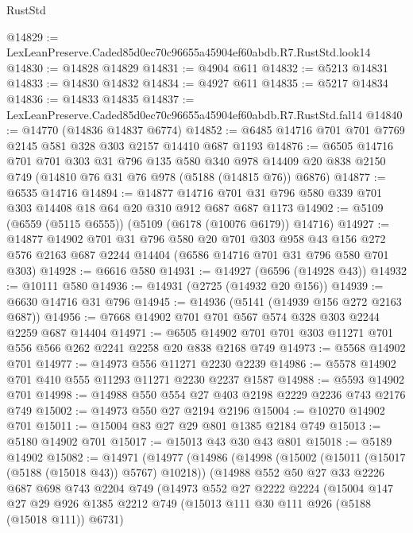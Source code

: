 \begin{lexlean}{RustStd}
\begin{coremodule}
@14829 := LexLeanPreserve.Caded85d0ec70c96655a45904ef60abdb.R7.RustStd.look14
@14830 := @14828 @14829
@14831 := @4904 @611
@14832 := @5213 @14831
@14833 := @14830 @14832
@14834 := @4927 @611
@14835 := @5217 @14834
@14836 := @14833 @14835
@14837 := LexLeanPreserve.Caded85d0ec70c96655a45904ef60abdb.R7.RustStd.fal14
@14840 := @14770 (@14836 @14837 @6774)
@14852 := @6485 @14716 @701 @701 @7769 @2145 @581 @328 @303 @2157 @14410 @687 @1193
@14876 := @6505
    @14716
    @701
    @701
    @303
    @31
    @796
    @135
    @580
    @340
    @978
    @14409
    @20
    @838
    @2150
    @749
    (@14810 @76 @31 @76 @978 (@5188 (@14815 @76)) @6876)
@14877 := @6535 @14716
@14894 := @14877
    @14716
    @701
    @31
    @796
    @580
    @339
    @701
    @303
    @14408
    @18
    @64
    @20
    @310
    @912
    @687
    @687
    @1173
@14902 := @5109 (@6559 (@5115 @6555)) (@5109 (@6178 (@10076 @6179)) @14716)
@14927 := @14877
    @14902
    @701
    @31
    @796
    @580
    @20
    @701
    @303
    @958
    @43
    @156
    @272
    @576
    @2163
    @687
    @2244
    @14404
    (@6586 @14716 @701 @31 @796 @580 @701 @303)
@14928 := @6616 @580
@14931 := @14927 (@6596 (@14928 @43))
@14932 := @10111 @580
@14936 := @14931 (@2725 (@14932 @20 @156))
@14939 := @6630 @14716 @31 @796
@14945 := @14936 (@5141 (@14939 @156 @272 @2163 @687))
@14956 := @7668 @14902 @701 @701 @567 @574 @328 @303 @2244 @2259 @687 @14404
@14971 := @6505 @14902 @701 @701 @303 @11271 @701 @556 @566 @262 @2241 @2258 @20 @838 @2168 @749
@14973 := @5568 @14902 @701
@14977 := @14973 @556 @11271 @2230 @2239
@14986 := @5578 @14902 @701 @410 @555 @11293 @11271 @2230 @2237 @1587
@14988 := @5593 @14902 @701
@14998 := @14988 @550 @554 @27 @403 @2198 @2229 @2236 @743 @2176 @749
@15002 := @14973 @550 @27 @2194 @2196
@15004 := @10270 @14902 @701
@15011 := @15004 @83 @27 @29 @801 @1385 @2184 @749
@15013 := @5180 @14902 @701
@15017 := @15013 @43 @30 @43 @801
@15018 := @5189 @14902
@15082 := @14971
    (@14977
      (@14986
        (@14998
          (@15002 (@15011 (@15017 (@5188 (@15018 @43)) @5767) @10218))
          (@14988
            @552
            @50
            @27
            @33
            @2226
            @687
            @698
            @743
            @2204
            @749
            (@14973
              @552
              @27
              @2222
              @2224
              (@15004
                @147
                @27
                @29
                @926
                @1385
                @2212
                @749
                (@15013 @111 @30 @111 @926 (@5188 (@15018 @111)) @6731)

\end{coremodule}
\end{lexlean}
